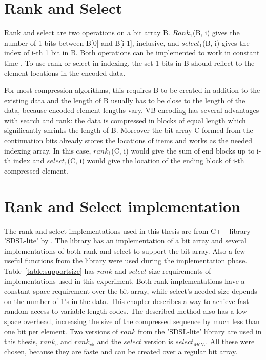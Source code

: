\section{Rank and Select}
Rank and select are two operations on a bit array B. $Rank_1$(B, i) gives the number of 1 bits between B[0] and B[i-1], inclusive, and 
$select_1$(B, i) gives the index of i-th 1 bit in B. Both operations can be implemented to work in constant time \citep[see, e.g.,][]{gbmp2014sea}. To use rank or select in indexing, the
set 1 bits in B should reflect to the element locations in the encoded data. 

For most compression algorithms, this requires B to be created in addition to the existing data and the length of B usually 
has to be close to the length of the data, because encoded element lengths vary. VB encoding has several advantages with search and rank: the data is compressed in 
blocks of equal length which significantly shrinks the length of B. Moreover the bit array C formed from the continuation bits already stores the locations of items and works
as the needed indexing array. In this case, $rank_1$(C, i) would give the sum of end blocks up to i-th index and $select_1$(C, i) would give the location of the ending block 
of i-th compressed element.

\section{Rank and Select implementation}

The rank and select implementations used in this thesis are from C++ library 'SDSL-lite' by \citep{gbmp2014sea}. The library has an implementation of a bit array and several implementations
 of both rank and select to support the bit array. Also a few useful functions from the library were used during the implementation phase. Table~\ref{table:supportsize} has $rank$ and $select$ 
size requirements of implementations used in this experiment. Both rank implementations have a constant space requirement over the bit array, while select's needed size depends on 
the number of 1's in the data. This chapter describes a way to achieve fast random access to variable length codes. The described method also has a low space overhead, increasing the size of the 
compressed sequence by much less than one bit per element. Two versions of $rank$ from the 'SDSL-lite' library are used in this thesis, $rank_v$ and $rank_{v5}$ and the $select$ version is $select_{MCL}$. 
All these were chosen, because they are faste and can be created over a regular bit array.

